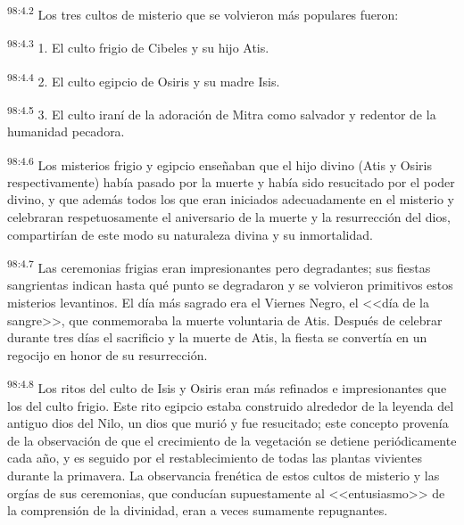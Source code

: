 \par
\textsuperscript{98:4.2} Los tres cultos de misterio que se volvieron más populares fueron:

\par
\textsuperscript{98:4.3} 1. El culto frigio de Cibeles y su hijo Atis.

\par
\textsuperscript{98:4.4} 2. El culto egipcio de Osiris y su madre Isis.

\par
\textsuperscript{98:4.5} 3. El culto iraní de la adoración de Mitra como salvador y redentor de la humanidad pecadora.

\par
\textsuperscript{98:4.6} Los misterios frigio y egipcio enseñaban que el hijo divino (Atis y Osiris respectivamente) había pasado por la muerte y había sido resucitado por el poder divino, y que además todos los que eran iniciados adecuadamente en el misterio y celebraran respetuosamente el aniversario de la muerte y la resurrección del dios, compartirían de este modo su naturaleza divina y su inmortalidad.

\par
\textsuperscript{98:4.7} Las ceremonias frigias eran impresionantes pero degradantes; sus fiestas sangrientas indican hasta qué punto se degradaron y se volvieron primitivos estos misterios levantinos. El día más sagrado era el Viernes Negro, el <<día de la sangre>>, que conmemoraba la muerte voluntaria de Atis. Después de celebrar durante tres días el sacrificio y la muerte de Atis, la fiesta se convertía en un regocijo en honor de su resurrección.

\par
\textsuperscript{98:4.8} Los ritos del culto de Isis y Osiris eran más refinados e impresionantes que los del culto frigio. Este rito egipcio estaba construido alrededor de la leyenda del antiguo dios del Nilo, un dios que murió y fue resucitado; este concepto provenía de la observación de que el crecimiento de la vegetación se detiene periódicamente cada año, y es seguido por el restablecimiento de todas las plantas vivientes durante la primavera. La observancia frenética de estos cultos de misterio y las orgías de sus ceremonias, que conducían supuestamente al <<entusiasmo>> de la comprensión de la divinidad, eran a veces sumamente repugnantes.


